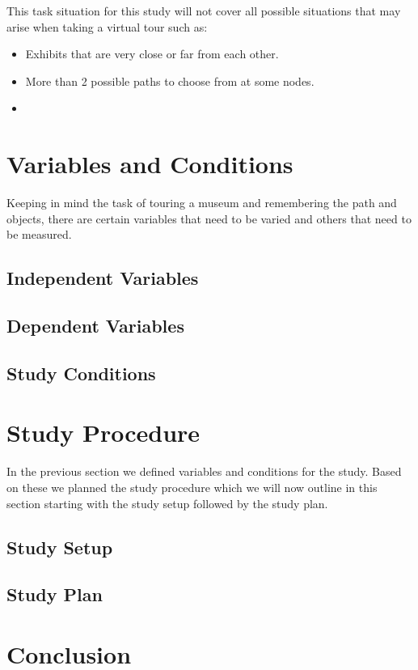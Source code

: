 This task situation for this study will not cover all possible situations that may arise when taking a virtual tour such as:
\begin{itemize}
	\item Exhibits that are very close or far from each other.
	\item More than 2 possible paths to choose from at some nodes.
	\item 
\end{itemize} 

\section{Variables and Conditions}
\label{section DPUS: Variables and Conditions}
Keeping in mind the task of touring a museum and remembering the path and objects, there are certain variables that need to be varied and others that need to be measured. 

\subsection{Independent Variables}
\label{subsection DPUS VC: Independent Variables}

\subsection{Dependent Variables}
\label{subsection DPUS VC: Dependent Variables}

\subsection{Study Conditions}
\label{subsection DPUS VC: Study Conditions}

\section{Study Procedure}
\label{section DPUS: Study Procedure}
In the previous section we defined variables and conditions for the study. Based on these we planned the study procedure which we will now outline in this section starting with the study setup followed by the study plan.

\subsection{Study Setup}
\label{subsection DPUS SP: Study Setup}

\subsection{Study Plan}
\label{subsection DPUS SP: Study Plan}

\section{Conclusion}
\label{section DPUS: Conclusion}



